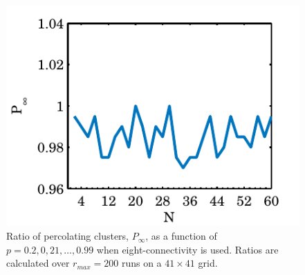 \begin{figure}
	\centering
	\includegraphics[width=\columnwidth]{./img/assignment_d_p_infinite_ratio_p.pdf}
	\caption{Ratio of percolating clusters, $P_\infty$, as a function of $p = 0.2, 0,21, \dotsc, 0.99$ when eight-connectivity is used. Ratios are calculated over $r_{max} = 200$ runs on a $41 \times 41$ grid.}
	\label{fig:experiment:conn:p_inf_ratio}
\end{figure}



